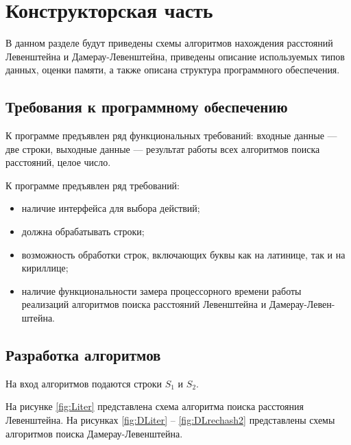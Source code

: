 \chapter{Конструкторская часть}

В данном разделе будут приведены схемы алгоритмов нахождения расстояний Левенштейна и Дамерау-Левенштейна, приведены описание используемых типов данных, оценки памяти, а также описана структура программного обеспечения.

\section{Требования к программному обеспечению}\label{section:requirements}

К программе предъявлен ряд функциональных требований: входные данные --- две строки, выходные данные --- результат работы всех алгоритмов поиска расстояний, целое число.

К программе предъявлен ряд требований:
\begin{itemize}[label=---]
	\item наличие интерфейса для выбора действий;
	\item должна обрабатывать строки;
	\item возможность обработки строк, включающих буквы как на латинице, так и на кириллице;
	\item наличие функциональности замера процессорного времени работы реализаций алгоритмов поиска расстояний Левенштейна и Дамерау-Левен- штейна.
\end{itemize}

\section{Разработка алгоритмов}

На вход алгоритмов подаются строки $S_1$ и $S_2$.

На рисунке \ref{fig:Liter} представлена схема алгоритма поиска расстояния Левенштейна.
На рисунках \ref{fig:DLiter} -- \ref{fig:DLrechash2} представлены схемы алгоритмов поиска Дамерау-Левенштейна.

